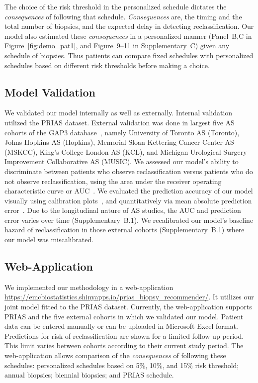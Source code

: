 The choice of the risk threshold in the personalized schedule dictates the \textit{consequences} of following that schedule. \textit{Consequences} are, the timing and the total number of biopsies, and the expected delay in detecting reclassification. Our model also estimated these \textit{consequences} in a personalized manner (Panel~B,C in Figure~\ref{fig:demo_pat1}, and Figure~9--11 in Supplementary~C) given any schedule of biopsies. Thus patients can compare fixed schedules with personalized schedules based on different risk thresholds before making a choice.

\subsection{Model Validation}
We validated our model internally as well as externally. Internal validation utilized the PRIAS dataset. External validation was done in largest five AS cohorts of the GAP3 database~\citep{gap3_2018}, namely University of Toronto AS (Toronto), Johns Hopkins AS (Hopkins), Memorial Sloan Kettering Cancer Center AS (MSKCC), King's College London AS (KCL), and Michigan Urological Surgery Improvement Collaborative AS (MUSIC). We assessed our model's ability to discriminate between patients who observe reclassification versus patients who do not observe reclassification, using the area under the receiver operating characteristic curve or AUC~\citep{rizopoulos2017dynamic}. We evaluated the prediction accuracy of our model visually using calibration plots~\citep{royston2013external,steyerberg2010assessing}, and quantitatively via mean absolute prediction error~\citep{rizopoulos2017dynamic}. Due to the longitudinal nature of AS studies, the AUC and prediction error varies over time (Supplementary~B.1). We recalibrated our model's baseline hazard of reclassification in those external cohorts (Supplementary~B.1) where our model was miscalibrated.

\subsection{Web-Application}
We implemented our methodology in a web-application \url{https://emcbiostatistics.shinyapps.io/prias_biopsy_recommender/}. It utilizes our joint model fitted to the PRIAS dataset. Currently, the web-application supports PRIAS and the five external cohorts in which we validated our model. Patient data can be entered manually or can be uploaded in Microsoft Excel format. Predictions for risk of reclassification are shown for a limited follow-up period. This limit varies between cohorts according to their current study period. The web-application allows comparison of the \textit{consequences} of following these schedules: personalized schedules based on 5\%, 10\%, and 15\% risk threshold; annual biopsies; biennial biopsies; and PRIAS schedule.